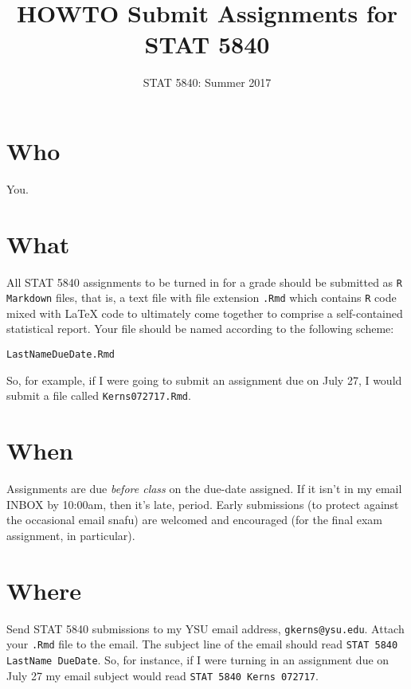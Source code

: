 \documentclass[10pt,english]{article}
\date{STAT 5840: Summer 2017}
\title{HOWTO Submit Assignments for STAT 5840}
\begin{document}
\maketitle
\thispagestyle{empty}

\section*{Who}
\label{sec:orgheadline1}
You.

\section*{What}
\label{sec:orgheadline2}
All STAT 5840 assignments to be turned in for a grade should be
submitted as \texttt{R Markdown} files, that is, a text file with file extension
\texttt{.Rmd} which contains \texttt{R} code mixed with \LaTeX{} code to
ultimately come together to comprise a self-contained statistical
report. Your file should be named according to the following scheme:

\begin{verbatim}
LastNameDueDate.Rmd
\end{verbatim}

So, for example, if I were going to submit an assignment due on July
27, I would submit a file called \texttt{Kerns072717.Rmd}.

\section*{When}
\label{sec:orgheadline3}
Assignments are due \emph{before class} on the due-date assigned.  If it
isn't in my email INBOX by 10:00am, then it's late, period.  Early
submissions (to protect against the occasional email snafu) are
welcomed and encouraged (for the final exam assignment, in
particular).

\section*{Where}
\label{sec:orgheadline4}
Send STAT 5840 submissions to my YSU email address, \texttt{gkerns@ysu.edu}.
Attach your \texttt{.Rmd} file to the email.  The subject line of the email
should read \texttt{STAT 5840 LastName DueDate}.  So, for instance, if I were
turning in an assignment due on July 27 my email subject would read
\texttt{STAT 5840 Kerns 072717}.
\end{document}
